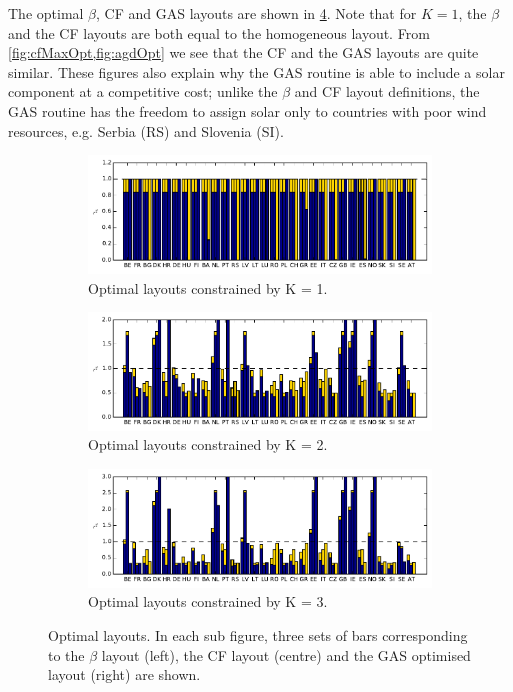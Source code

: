 \documentclass[a4paper, 5p, sort&compress]{elsarticle}%
\newcommand{\chromowidth}{1.00 \columnwidth}
\begin{document}
The optimal $\beta$, CF and GAS layouts are shown in
\cref{fig:optLayouts}. Note that for $K=1$, the $\beta$ and the
CF layouts are both equal to the homogeneous layout. From
\cref{fig:cfMaxOpt,fig:agdOpt} we see that the CF and the GAS
layouts are quite similar. These figures also explain why the GAS
routine is able to include a solar component at a competitive cost;
unlike the $\beta$ and CF layout definitions, the GAS routine has
the freedom to assign solar only to countries with poor wind
resources, e.g. Serbia (RS) and Slovenia (SI).


\begin{figure}[p!]
  \centering
  \begin{subfigure}{2\columnwidth}
    \includegraphics[width = \chromowidth, center]{k=1-layouts}
    \caption{Optimal layouts constrained by K = 1.}
    \label{fig:betaOpt}
  \end{subfigure}
  \begin{subfigure}{2\columnwidth}
    \includegraphics[width = \chromowidth, center]{k=2-layouts}
    \caption{Optimal layouts constrained by K = 2.}
    \label{fig:cfMaxOpt}
  \end{subfigure}
  \begin{subfigure}{2\columnwidth}
    \includegraphics[width = \chromowidth, center]{k=3-layouts}
    \caption{Optimal layouts constrained by K = 3.}
    \label{fig:agdOpt}
  \end{subfigure}
  \caption{Optimal layouts. In each sub figure, three sets of bars
    corresponding to the $\beta$ layout (left), the CF layout (centre) and
    the GAS optimised layout (right) are shown.}
  \label{fig:optLayouts}
\end{figure}
\end{document}
